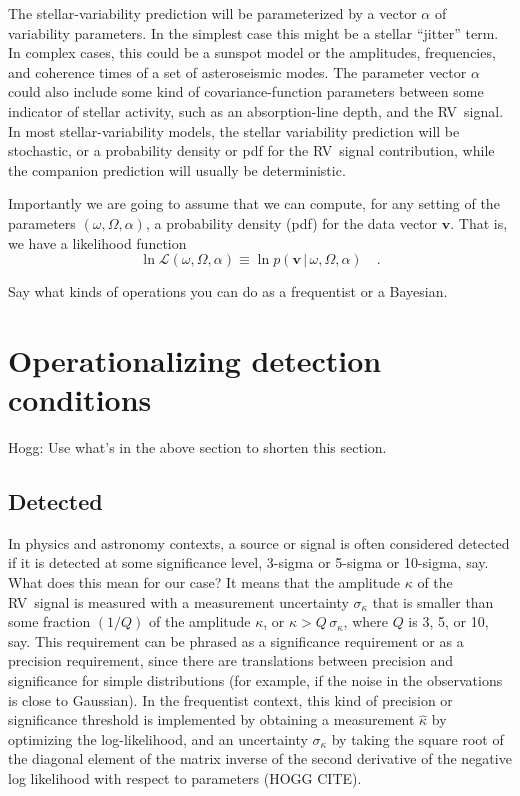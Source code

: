 \documentclass[modern]{aastex63}
\newcommand{\acronym}[1]{{\small{#1}}}
\newcommand{\rv}{\acronym{RV}}
\newcommand{\given}{\,|\,}
\renewcommand{\vector}[1]{\boldsymbol{#1}}
\newcommand{\like}{\mathscr{L}}
\newcommand{\lnlike}{\ln\like}
\newcommand{\vv}{\vector{v}}
\begin{document}
The stellar-variability prediction will be parameterized by a vector
$\alpha$ of variability parameters.
In the simplest case this might be a stellar ``jitter'' term.
In complex cases, this could be a sunspot model or the amplitudes,
frequencies, and coherence times of a set of asteroseismic modes.
The parameter vector $\alpha$ could also include some kind of
covariance-function parameters between some indicator of stellar
activity, such as an absorption-line depth, and the \rv\ signal.
In most stellar-variability models, the stellar variability prediction
will be stochastic, or a probability density or pdf for the \rv\
signal contribution, while the companion prediction will usually be
deterministic.

Importantly we are going to assume that we can compute, for any setting
of the parameters $(\omega, \Omega, \alpha)$, a probability density
(pdf) for the data vector $\vv$. That is, we have a likelihood function
\begin{equation}
\lnlike(\omega,\Omega,\alpha) \equiv \ln p(\vv\given\omega,\Omega,\alpha)
\quad .
\end{equation}

Say what kinds of operations you can do as a frequentist or a Bayesian.

\section{Operationalizing detection conditions}

Hogg: Use what's in the above section to shorten this section.

\subsection{Detected}

In physics and astronomy contexts, a source or signal is often
considered detected if it is detected at some significance level,
3-sigma or 5-sigma or 10-sigma, say. What does this mean for our case?
It means that the amplitude $\kappa$ of the \rv\ signal is measured
with a measurement uncertainty $\sigma_\kappa$ that is smaller than
some fraction $(1/Q)$ of the amplitude $\kappa$, or $\kappa >
Q\,\sigma_\kappa$, where $Q$ is 3, 5, or 10, say.
This requirement can be phrased as a significance requirement or as a
precision requirement, since there are translations between precision
and significance for simple distributions (for example, if the noise
in the observations is close to Gaussian).
In the frequentist context, this kind of precision or significance
threshold is implemented by obtaining a measurement $\hat{\kappa}$ by
optimizing the log-likelihood, and an uncertainty $\sigma_\kappa$ by
taking the square root of the diagonal element of the matrix inverse
of the second derivative of the negative log likelihood with respect
to parameters (HOGG CITE).
\end{document}
